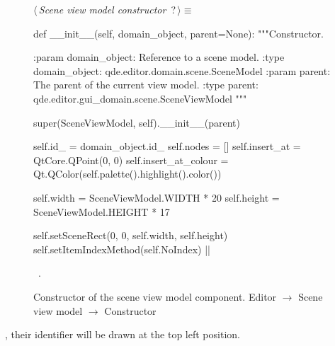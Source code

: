\documentclass[%
    a4paper,    %
    justified,  %
    nobib,      %
    openany     %
]{tufte-book}
\makeatletter
\renewcommand{\label}[1]{\@tufte@label{##1}}%
\makeatother
\begin{document}
\begin{figure}
\begin{flushleft} \small
\begin{minipage}{\linewidth}\label{scrap90}\raggedright\small
{} $\langle\,${\itshape Scene view model constructor}\nobreak\ {\footnotesize {?}}$\,\rangle\equiv$
\vspace{-1ex}
\begin{pythoncode}
def __init__(self, domain_object, parent=None):
   """Constructor.

   :param domain_object: Reference to a scene model.
   :type  domain_object: qde.editor.domain.scene.SceneModel
   :param parent:        The parent of the current view model.
   :type parent:         qde.editor.gui_domain.scene.SceneViewModel
   """

   super(SceneViewModel, self).__init__(parent)

   self.id_              = domain_object.id_
   self.nodes            = []
   self.insert_at        = QtCore.QPoint(0, 0)
   self.insert_at_colour = Qt.QColor(self.palette().highlight().color())

   self.width            = SceneViewModel.WIDTH * 20
   self.height           = SceneViewModel.HEIGHT * 17

   self.setSceneRect(0, 0, self.width, self.height)
   self.setItemIndexMethod(self.NoIndex)
|\NWsep|
\end{pythoncode}
\vspace{1.5ex}
\footnotesize
\begin{list}{}{\setlength{\itemsep}{-\parsep}\setlength{\itemindent}{-\leftmargin}}
\item \NWtxtMacroRefIn\ .

\item{}
\end{list}
\end{minipage}\vspace{4ex}
\end{flushleft}
\caption{Constructor of the scene view model component.
  \newline{}\newline{}Editor $\rightarrow$ Scene view model $\rightarrow$
  Constructor}
\label{editor:lst:scene-view-model:constructor}
\end{figure}

, their identifier
will be drawn at the top left position.
\end{document}
